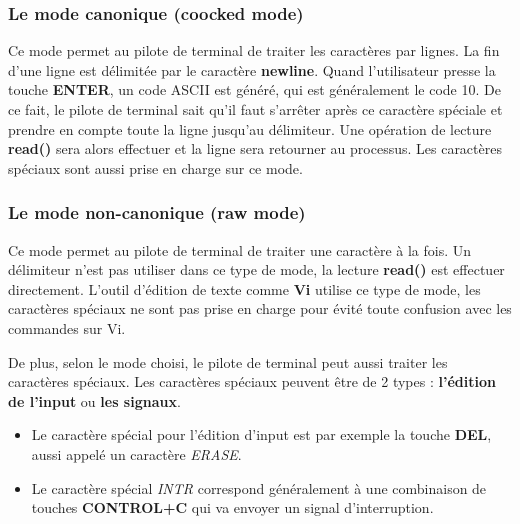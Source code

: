 \newpage

\subsubsection{Le mode canonique (coocked mode)}
Ce mode permet au pilote de terminal de traiter les caractères par lignes. La fin d'une ligne est délimitée par le caractère \textbf{newline}.
Quand l'utilisateur presse la touche \textbf{ENTER}, un code ASCII est généré, qui est généralement le code 10. De ce fait, le pilote de terminal sait qu'il faut s'arrêter après ce caractère spéciale et prendre en compte toute la ligne jusqu'au délimiteur.
Une opération de lecture \textbf{read()} sera alors effectuer et la ligne sera retourner au processus. Les caractères spéciaux sont aussi prise en charge sur ce mode.

\subsubsection{Le mode non-canonique (raw mode)}
Ce mode permet au pilote de terminal de traiter une caractère à la fois. Un délimiteur n'est pas utiliser dans ce type de mode, la lecture \textbf{read()} est effectuer directement.
L'outil d'édition de texte comme \textbf{Vi} utilise ce type de mode, les caractères spéciaux ne sont pas prise en charge pour évité toute confusion avec les commandes sur Vi.

\hspace{1cm}

De plus, selon le mode choisi, le pilote de terminal peut aussi traiter les caractères spéciaux.
Les caractères spéciaux peuvent être de 2 types : \textbf{l'édition de l'input} ou \textbf{les signaux}.

\begin{itemize}
    \item Le caractère spécial pour l'édition d'input est par exemple la touche \textbf{DEL}, aussi appelé un caractère \textit{ERASE}.
    \item Le caractère spécial \textit{INTR} correspond généralement à une combinaison de touches \textbf{CONTROL+C} qui va envoyer un signal d'interruption.
\end{itemize}

\hspace{1cm}

